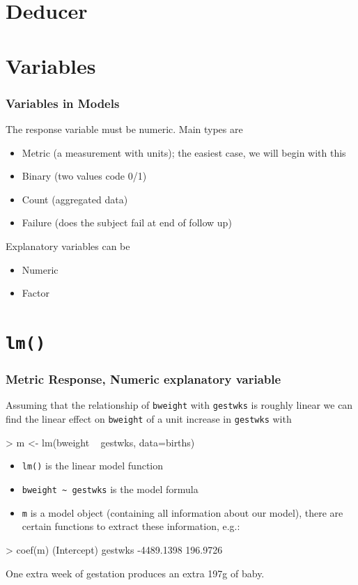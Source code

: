 \documentclass[xcolor={table}]{beamer}
\begin{document}
\section{Deducer}


\section{Variables}
\begin{frame}\frametitle{Variables in Models}
The response variable must be numeric. Main types are
\begin{itemize}
\item Metric (a measurement with units); the easiest case, we will begin with this
\item Binary (two values code 0/1) 
\item Count (aggregated data)
\item Failure (does the subject fail at end of follow up)
\end{itemize}
Explanatory variables can be
\begin{itemize}
\item Numeric
\item Factor
\end{itemize}
\end{frame}

\section{\texttt{lm()}}
\begin{frame}[fragile]\frametitle{Metric Response, Numeric explanatory variable}
Assuming that the relationship of \texttt{bweight} with \texttt{gestwks} is roughly linear we can find the linear effect on \texttt{bweight} of a unit increase in \texttt{gestwks} with

\begin{semiverbatim}
> m <- lm(bweight ~ gestwks, data=births)
\end{semiverbatim}

\begin{itemize}
\item \texttt{lm()} is the linear model function
\item \verb|bweight ~ gestwks| is the model formula
\item \texttt{m} is a model object (containing all information about our model), there are certain functions to extract these information, e.g.:
\end{itemize}

\begin{semiverbatim}
> coef(m)
(Intercept)     gestwks 
 -4489.1398    196.9726 
\end{semiverbatim}

One extra week of gestation produces an extra 197g of baby.
\end{frame}
\end{document}
